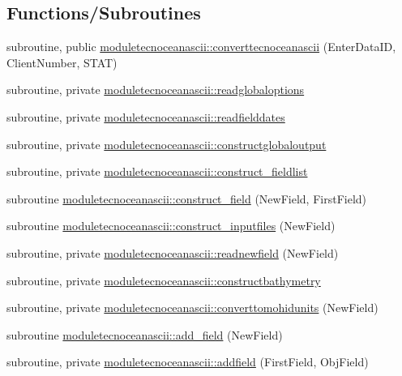 \subsection*{Functions/\+Subroutines}
\begin{DoxyCompactItemize}
\item 
subroutine, public \mbox{\hyperlink{namespacemoduletecnoceanascii_a911ff8ebfeb289d3cf85e2a5a6543289}{moduletecnoceanascii\+::converttecnoceanascii}} (Enter\+Data\+ID, Client\+Number, S\+T\+AT)
\item 
subroutine, private \mbox{\hyperlink{namespacemoduletecnoceanascii_a03b597bccde1ea1f6661a59bd7599167}{moduletecnoceanascii\+::readglobaloptions}}
\item 
subroutine, private \mbox{\hyperlink{namespacemoduletecnoceanascii_a46dae8318879d56217ce0452e09fa5a5}{moduletecnoceanascii\+::readfielddates}}
\item 
subroutine, private \mbox{\hyperlink{namespacemoduletecnoceanascii_ac3c04e7c0109f285ad61e9110701e6ce}{moduletecnoceanascii\+::constructglobaloutput}}
\item 
subroutine, private \mbox{\hyperlink{namespacemoduletecnoceanascii_af8c388a8fbef00e24b5198034a12ff26}{moduletecnoceanascii\+::construct\+\_\+fieldlist}}
\item 
subroutine \mbox{\hyperlink{namespacemoduletecnoceanascii_a5faf63426f042e591c210443525285aa}{moduletecnoceanascii\+::construct\+\_\+field}} (New\+Field, First\+Field)
\item 
subroutine \mbox{\hyperlink{namespacemoduletecnoceanascii_a974670f0506425b9522707dfc6ef649c}{moduletecnoceanascii\+::construct\+\_\+inputfiles}} (New\+Field)
\item 
subroutine, private \mbox{\hyperlink{namespacemoduletecnoceanascii_a3a6fefcdee1dbb139d00be33aaf2e48f}{moduletecnoceanascii\+::readnewfield}} (New\+Field)
\item 
subroutine, private \mbox{\hyperlink{namespacemoduletecnoceanascii_a9bbaf3300cee7d2c04f566610643dbe8}{moduletecnoceanascii\+::constructbathymetry}}
\item 
subroutine, private \mbox{\hyperlink{namespacemoduletecnoceanascii_acb08e8b922f987a8851cdd00f46ab1ac}{moduletecnoceanascii\+::converttomohidunits}} (New\+Field)
\item 
subroutine \mbox{\hyperlink{namespacemoduletecnoceanascii_a3b498ef686c47e5dae7627d7045ed16a}{moduletecnoceanascii\+::add\+\_\+field}} (New\+Field)
\item 
subroutine, private \mbox{\hyperlink{namespacemoduletecnoceanascii_a361f990e2a215ebad88b6439bbc0ccaf}{moduletecnoceanascii\+::addfield}} (First\+Field, Obj\+Field)

\end{DoxyCompactItemize}
